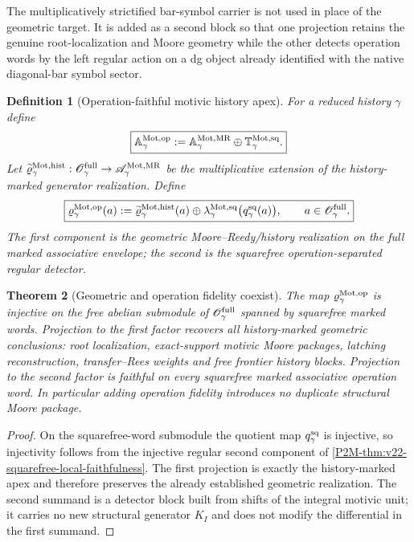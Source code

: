 \documentclass[11pt]{article}
\newtheorem{theorem}{Theorem}[section]
\newtheorem{definition}[theorem]{Definition}
\theoremstyle{remark}
\newcommand{\Mot}{\mathrm{Mot}}
\newcommand{\MR}{\mathrm{MR}}
\begin{document}
The multiplicatively strictified bar-symbol carrier is not used in place of the
geometric target.  It is added as a second block so that one projection retains
the genuine root-localization and Moore geometry while the other detects
operation words by the left regular action on a dg object already identified
with the native diagonal-bar symbol sector.

\begin{definition}[Operation-faithful motivic history apex]
\label{P2M-def:v22-operation-faithful-apex}
For a reduced history $\gamma$ define
\begin{equation}
 \boxed{
 \mathbb A_{\gamma}^{\Mot,\rm op}
 :=\mathbb A_{\gamma}^{\Mot,\MR}
   \oplus\mathbb T_{\gamma}^{\Mot,\rm sq}.}
\end{equation}
Let
$\widetilde\varrho_{\gamma}^{\Mot,\rm hist}:
 \mathscr O_{\gamma}^{\rm full}\to\mathscr A_{\gamma}^{\Mot,\MR}$
be the multiplicative extension of the history-marked generator realization.
Define
\begin{equation}
 \boxed{
 \varrho_{\gamma}^{\Mot,\rm op}(a)
 :=\widetilde\varrho_{\gamma}^{\Mot,\rm hist}(a)
   \oplus\lambda_{\gamma}^{\Mot,\rm sq}
          \bigl(q_{\gamma}^{\rm sq}(a)\bigr),
 \qquad a\in\mathscr O_{\gamma}^{\rm full}.}
\end{equation}
The first component is the geometric Moore--Reedy/history realization on the
full marked associative envelope; the second is the squarefree
operation-separated regular detector.
\end{definition}

\begin{theorem}[Geometric and operation fidelity coexist]
\label{P2M-thm:v22-geometric-operation-coexistence}
The map $\varrho_{\gamma}^{\Mot,\rm op}$ is injective on the free abelian
submodule of $\mathscr O_{\gamma}^{\rm full}$ spanned by squarefree marked
words.  Projection to the first factor recovers all
history-marked geometric conclusions: root localization, exact-support motivic Moore
packages, latching reconstruction, transfer--Rees weights and free frontier
history blocks.  Projection to the second factor is faithful on every
squarefree marked associative operation word.  In particular adding operation
fidelity introduces no duplicate structural Moore package.
\end{theorem}

\begin{proof}
On the squarefree-word submodule the quotient map
$q_{\gamma}^{\rm sq}$ is injective, so injectivity follows from the injective
regular second component of \cref{P2M-thm:v22-squarefree-local-faithfulness}.  The first projection is exactly
the history-marked apex and therefore preserves the already established geometric
realization.  The second summand is a detector block built from shifts of the integral
motivic unit; it carries no new structural generator $K_I$ and does not modify
the differential in the first summand.
\end{proof}
\end{document}
